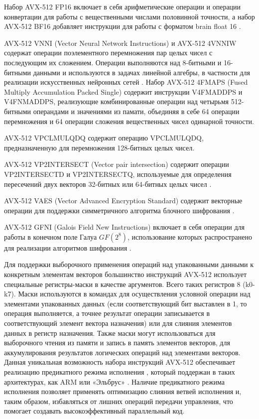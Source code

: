Набор AVX-512 FP16 включает в себя арифметические операции и операции конвертации для работы с вещественными числами половинной точности, а набор AVX-512 BF16 добавляет инструкции для работы с форматом brain float 16 \cite{Kalamkar2019VecBF16}.

AVX-512 VNNI (Vector Neural Network Instructions) и AVX-512 4VNNIW содержат операции поэлементного перемножения пар целых чисел с последующим их сложением.
Операции выполняются над 8-битными и 16-битными данными и используются в задачах линейной алгебры, в частности для реализации искусственных нейронных сетей \cite{Zhou2024VecVNNI}.
Набор AVX-512 4FMAPS (Fused Multiply Accumulation Packed Single) содержит инструкции V4FMADDPS и V4FNMADDPS, реализующие комбинированные операции над четырьмя 512-битными операндами и значениями из памати, объединяя в себе 64 операции перемножения и 64 операции сложения вещественных чисел одинарной точности.

AVX-512 VPCLMULQDQ содержит операцию VPCLMULQDQ, предназначенную для перемножения 128-битных целых чисел.

AVX-512 VP2INTERSECT (Vector pair intersection) содержит операции VP2INTERSECTD и VP2INTERSECTQ, используемые для определения пересечений двух векторов 32-битных или 64-битных целых чисел \cite{DiezCanas2021VecVP2Int}.

AVX-512 VAES (Vector Advanced Encryption Standard) содержит векторные операции для поддержки симметричного алгоритма блочного шифрования \cite{Kovats2024VecAES}.

AVX-512 GFNI (Galois Field New Instructions) включает в себя операции для работы в конечном поле Галуа $GF(2^8)$, использование которых распространено для реализации алгоритмов шифрования \cite{Yoo2023VecGFNI}.

Для поддержки выборочного применения операций над упакованными данными к конкретным элементам векторов большинство инструкций AVX-512 использует специальные регистры-маски в качестве аргументов.
Всего таких регистров 8 (k0-k7).
Маски используются в командах для осуществления условной операции над элементами упакованных данных (если соответствующий бит выставлен в 1, то операция выполняется, а точнее результат операции записывается в соответствующий элемент вектора назначения) или для слияния элементов данных в регистр назначения.
Также маски могут использоваться для выборочного чтения из памяти и запись в память элементов векторов, для аккумулирования результатов логических операций над элементами векторов.
Данная уникальная возможность набора инструкций AVX-512 обеспечивает реализацию предикатного режима исполнения \cite{Volkonsky2003VecPred}, который поддержан в таких архитектурах, как ARM\label{abbr:arm} или «Эльбрус» \cite{Kim2013VecElb}.
Наличие предикатного режима исполнения позволяет применять оптимизацию слияния ветвей исполнения и, таким образом, избавляться от лишних операций передачи управления, что помогает создавать высокоэффективный параллельный код.

